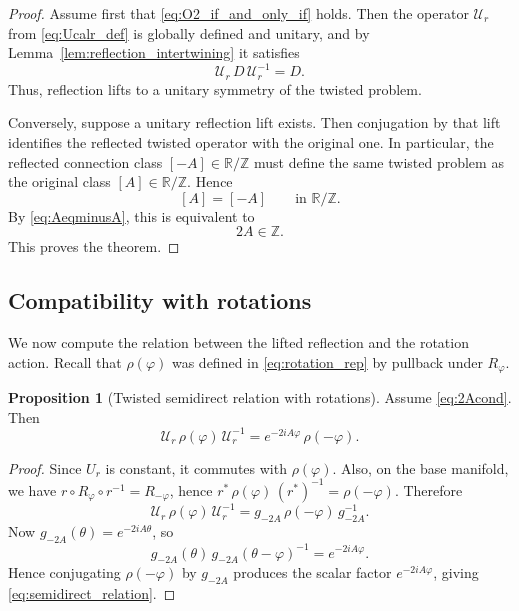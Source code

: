 \documentclass[11pt]{article}
\theoremstyle{definition}
\newtheorem{proposition}[theorem]{Proposition}
\numberwithin{equation}{section}
\begin{document}
\begin{proof}
Assume first that \eqref{eq:O2_if_and_only_if} holds. Then the operator \(\mathcal U_r\) from
\eqref{eq:Ucalr_def} is globally defined and unitary, and by Lemma~\ref{lem:reflection_intertwining}
it satisfies
\begin{equation}\label{eq:reflection_symmetry_proof}
\mathcal U_r\,D\,\mathcal U_r^{-1}=D.
\end{equation}
Thus, reflection lifts to a unitary symmetry of the twisted problem.

Conversely, suppose a unitary reflection lift exists. Then conjugation by that lift identifies the reflected twisted operator with the original one. In particular, the reflected connection class \([-A]\in \mathbb R/\mathbb Z\) must define the same twisted problem as the original class \([A]\in \mathbb R/\mathbb Z\). Hence
\begin{equation}\label{eq:proof_holonomy_classes}
[A]=[-A]
\qquad
\text{in }\mathbb R/\mathbb Z.
\end{equation}
By \eqref{eq:AeqminusA}, this is equivalent to
\begin{equation}\label{eq:proof_2A_integer}
2A\in\mathbb Z.
\end{equation}
This proves the theorem.
\end{proof}

\subsection{Compatibility with rotations}

We now compute the relation between the lifted reflection and the rotation action. Recall that \(\rho(\varphi)\) was defined in \eqref{eq:rotation_rep} by pullback under \(R_\varphi\).

\begin{proposition}[Twisted semidirect relation with rotations]
\label{prop:semidirect_relation}
Assume \eqref{eq:2Acond}. Then
\begin{equation}\label{eq:semidirect_relation}
\mathcal U_r\,\rho(\varphi)\,\mathcal U_r^{-1}
=
e^{-2iA\varphi}\,\rho(-\varphi).
\end{equation}
\end{proposition}

\begin{proof}
Since \(U_r\) is constant, it commutes with \(\rho(\varphi)\). Also, on the base manifold, we have \(r\circ R_\varphi\circ r^{-1}=R_{-\varphi}\), hence \(r^*\,\rho(\varphi)\,(r^*)^{-1}
=
\rho(-\varphi)\).
Therefore
\begin{equation}\label{eq:semidirect_calc_start}
\mathcal U_r\,\rho(\varphi)\,\mathcal U_r^{-1}
=
g_{-2A}\,\rho(-\varphi)\,g_{-2A}^{-1}.
\end{equation}
Now \(g_{-2A}(\theta)=e^{-2iA\theta}\), so
\begin{equation}\label{eq:gauge_rotation_commute}
g_{-2A}(\theta)\,g_{-2A}(\theta-\varphi)^{-1}
=
e^{-2iA\varphi}.
\end{equation}
Hence conjugating \(\rho(-\varphi)\) by \(g_{-2A}\) produces the scalar factor \(e^{-2iA\varphi}\), giving \eqref{eq:semidirect_relation}.
\end{proof}
\end{document}
